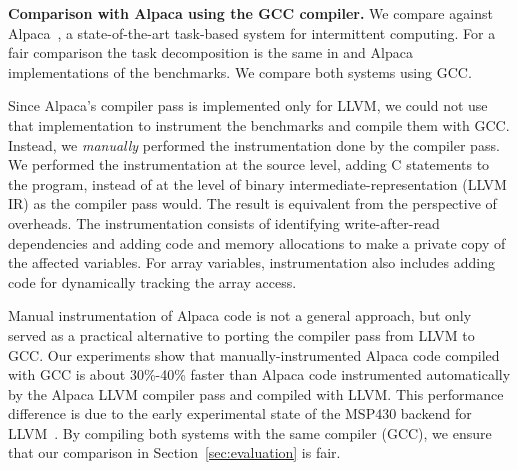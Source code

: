 
\textbf{Comparison with Alpaca using the GCC compiler.} We compare
\sys against Alpaca~\cite{alpaca}, a state-of-the-art task-based system for
intermittent computing. For a fair comparison the task decomposition is the
same in \sys and Alpaca implementations of the benchmarks. We compare
both systems using GCC.

Since Alpaca's compiler pass is implemented only for LLVM, we could not use
that implementation to instrument the benchmarks and compile them with GCC.
Instead, we \emph{manually} performed the instrumentation done by the compiler
pass.  We performed the instrumentation at the source level, adding C
statements to the program, instead of at the level of binary
intermediate-representation (LLVM IR) as the compiler pass would. The result is
equivalent from the perspective of overheads. The instrumentation consists of
identifying write-after-read dependencies and adding code and memory
allocations to make a private copy of the affected variables. For array
variables, instrumentation also includes adding code for 
dynamically tracking the array access.

Manual instrumentation of Alpaca code is not a general approach, but only
served as a practical alternative to porting the compiler pass from LLVM to
GCC.
%
Our experiments show that manually-instrumented Alpaca code compiled with GCC
is about 30\%-40\% faster than Alpaca code instrumented automatically by the
Alpaca LLVM compiler pass and compiled with LLVM. This performance difference
is due to the early experimental state of the MSP430 backend for
LLVM~\cite{baghsorkhi_cgo_2018}.
%
By compiling both systems with the same compiler (GCC), we ensure that our
comparison in Section~\ref{sec:evaluation} is fair.\vspace{2cm}

